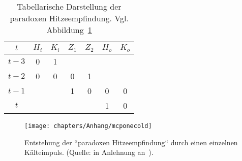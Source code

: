 \begin{table} %
    \centering
    \begin{tabular}{c | c | c | c | c | c | c}
        $t$   & $H_i$ & $K_i$ & $Z_1$ & $Z_2$ & $H_o$ & $K_o$ \\
        \hline
        $t-3$   &  0  &  1  &    &    &    &  \\
        $t-2$   &  0  &  0  &  0  & 1   &    &  \\
        $t-1$   &    &    &   1 & 0   &  0  & 0 \\
        $t$   &    &    &    &    &  1  & 0 \\
    \end{tabular}
    \caption{Tabellarische Darstellung der paradoxen Hitzeempfindung. Vgl. Abbildung~\ref{fig-heatparad}}
    \label{tab:heatparad}
\end{table}


\begin{figure}[h]
    \centering
    \texttt{[image: chapters/Anhang/mcponecold]}
    \caption{Entstehung der ``paradoxen Hitzeempfindung`` durch einen einzelnen Kälteimpuls. (Quelle: in Anlehnung an~\cite[34, Figure 1.22]{Fau94}).}
    \label{fig-heatparad}
\end{figure}



